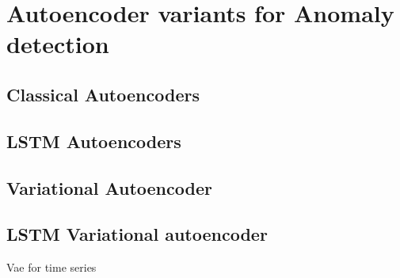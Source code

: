 \section{Autoencoder variants for Anomaly detection}

\subsection{Classical Autoencoders}
\subsection{LSTM Autoencoders}
\subsection{Variational Autoencoder}
\subsection{LSTM Variational autoencoder}

Vae for time series \cite{desai2021timevae}